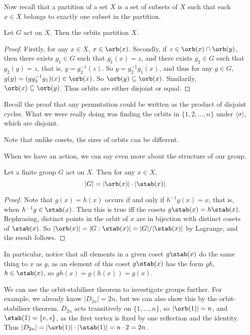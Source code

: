 \documentclass[a4]{scrreprt}
\begin{document}
Now recall that a partition of a set $X$ is a set of subsets of $X$ such that each $x \in X$ belongs to exactly one subset in the partition.

\begin{lemma}
	Let $G$ act on $X$. Then the orbits partition $X$.
\end{lemma}
\begin{proof}
	Firstly, for any $x \in X$, $x \in \orb(x)$. Secondly, if $z \in \orb(x) \cap \orb(y)$, then there exists $g_1 \in G$ such that $g_1(x) = z$, and there exists $g_2 \in G$ such that $g_2 (y) = z$, that is, $y = g_2^{-1}(z)$. So $y = g_2^{-1} g_1 (x)$, and thus for any $g \in G$, $g(y) = (g g_2^{-1} g_1)(x) \in \orb(x)$. So $\orb(y) \subseteq \orb(x)$. Similarily, $\orb(x) \subseteq \orb(y)$. Thus orbits are either disjoint or equal.
\end{proof}

Recall the proof that any permutation could be written as the product of disjoint cycles. What we were really doing was finding the orbits in $\{1, 2, \dots, n\}$ under $\langle \sigma \rangle$, which are disjoint.

\begin{remark}
	Note that unlike cosets, the sizes of orbits can be different.
\end{remark}

When we have an action, we can say even more about the structure of our group.

\begin{theorem}
	Let a finite group $G$ act on $X$. Then for any $x \in X$,
	$$
	|G| = |\orb(x)| \cdot |\stab(x)|.
	$$
\end{theorem}
\begin{proof}
	Note that $g(x) = h(x)$ occurs if and only if $h^{-1} g (x) = x$, that is, when $h^{-1} g \in \stab(x)$. Then this is true iff the cosets $g \stab(x) = h\stab(x)$. Rephrasing, distinct points in the orbit of $x$ are in bijection with distinct cosets of $\stab(x)$. So $|\orb(x)| = |G : \stab(x)| = |G| / |\stab(x) |$ by Lagrange, and the result follows.
\end{proof}

In particular, notice that all elements in a given coset $g \stab(x)$ do the same thing to $x$ as $g$, as an element of this coset $g\stab(x)$ has the form $gh$, $h \in \stab(x)$, so $gh(x) = g(h(x)) = g(x)$.

We can use the orbit-stabiliser theorem to investigate groups further. For example, we already know $|D_{2n}| = 2n$, but we can also show this by the orbit-stabiliser theorem. $D_{2n}$ acts transitively on $\{1, \dots, n\}$, so $|\orb(1)| = n$, and $\stab(1) = \{e, s\}$, as the first vertex is fixed by one reflection and the identity. Thus $|D_{2n}| = |\orb(1)| \cdot |\stab(1)| = n \cdot 2 = 2n$.
\end{document}
